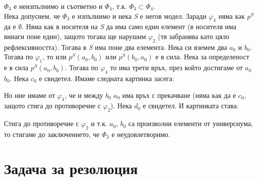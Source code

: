 \documentclass[12pt]{article}
\begin{document}
\vskip 0.2in
$\varPhi_3$ е неизпълнимо и съответно и $\varPhi_4$, т.к. $\varPhi_3 \subset \varPhi_4$.\\
Нека допуснем, че $\varPhi_3$ е изпълнимо и нека \textit{S} е негов модел. Заради $\varphi_4$ няма как $p^S$ да е $\emptyset$. Няма как в носителя на \textit{S} да има само един елемент (в носителя има винаги поне един), защото тогава ще нарушим $\varphi_2$ (тя забранява като цяло рефлексивността). Тогава в \textit{S} има поне два елемента. Нека си вземем два $a_0$ и $b_0$. Тогава по $\varphi_1$, то или $p^S(a_0, b_0)$ или $p^S(b_0, a_0)$ е в сила. Нека за определеност е в сила $p^S(a_0, b_0)$. Тогава по $\varphi_4$ то има трети връх, през който достигаме от $a_0$ $b_0$. Нека $c_0$ е свидетел. Имаме следната картинка засега:
\begin{center}
\end{center}
Но ние имаме от $\varphi_4$, че и между $b_0$ $a_0$ има връх с прекачване (няма как да е $c_0$, защото стига до противоречие с $\varphi_2$). Нека $d_0$ е свидетел. И картинката става:
\begin{center}
\end{center}
Стига до противоречие с $\varphi_2$ и т.к. $a_0$, $b_0$ са произволни елементи от универсиума, то стигаме до заключението, че $\varPhi_3$ е неудовлетворимо.

\newpage
\section{Задача за резолюция}
\end{document}
